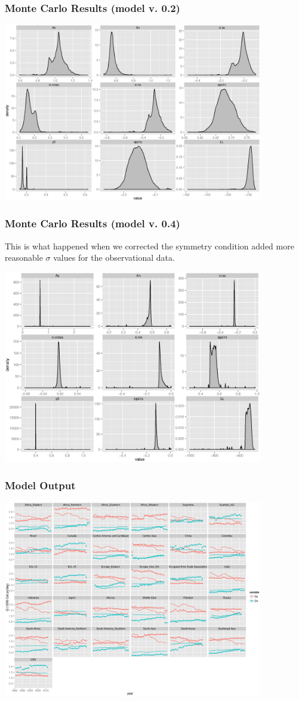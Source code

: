 \documentclass{beamer}
\begin{document}
\begin{frame}
  \frametitle{Monte Carlo Results (model v. 0.2)}
  \begin{center}
    \includegraphics[width=0.85\textwidth]{fig/mcrslt-v0_2-allrgn.eps}
  \end{center}
\end{frame}

\begin{frame}
  \frametitle{Monte Carlo Results (model v. 0.4)}
  This is what happened when we corrected the symmetry condition added
  more reasonable $\sigma$ values for the observational data.
  \begin{center}
    \includegraphics[width=0.85\textwidth]{fig/mcrslt-v0_4-allrgn.eps}
  \end{center}
\end{frame}

\begin{frame}
  \frametitle{Model Output}
  \begin{center}
    \includegraphics[width=0.85\textwidth]{fig/demand-byyear-allrgn.eps}
  \end{center}
\end{frame}
\end{document}
